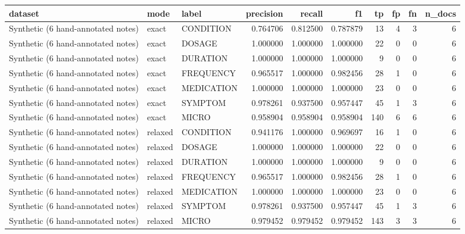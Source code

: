 \begin{tabular}{lllrrrrrrr}
\toprule
dataset & mode & label & precision & recall & f1 & tp & fp & fn & n\_docs \\
\midrule
Synthetic (6 hand-annotated notes) & exact & CONDITION & 0.764706 & 0.812500 & 0.787879 & 13 & 4 & 3 & 6 \\
Synthetic (6 hand-annotated notes) & exact & DOSAGE & 1.000000 & 1.000000 & 1.000000 & 22 & 0 & 0 & 6 \\
Synthetic (6 hand-annotated notes) & exact & DURATION & 1.000000 & 1.000000 & 1.000000 & 9 & 0 & 0 & 6 \\
Synthetic (6 hand-annotated notes) & exact & FREQUENCY & 0.965517 & 1.000000 & 0.982456 & 28 & 1 & 0 & 6 \\
Synthetic (6 hand-annotated notes) & exact & MEDICATION & 1.000000 & 1.000000 & 1.000000 & 23 & 0 & 0 & 6 \\
Synthetic (6 hand-annotated notes) & exact & SYMPTOM & 0.978261 & 0.937500 & 0.957447 & 45 & 1 & 3 & 6 \\
Synthetic (6 hand-annotated notes) & exact & MICRO & 0.958904 & 0.958904 & 0.958904 & 140 & 6 & 6 & 6 \\
Synthetic (6 hand-annotated notes) & relaxed & CONDITION & 0.941176 & 1.000000 & 0.969697 & 16 & 1 & 0 & 6 \\
Synthetic (6 hand-annotated notes) & relaxed & DOSAGE & 1.000000 & 1.000000 & 1.000000 & 22 & 0 & 0 & 6 \\
Synthetic (6 hand-annotated notes) & relaxed & DURATION & 1.000000 & 1.000000 & 1.000000 & 9 & 0 & 0 & 6 \\
Synthetic (6 hand-annotated notes) & relaxed & FREQUENCY & 0.965517 & 1.000000 & 0.982456 & 28 & 1 & 0 & 6 \\
Synthetic (6 hand-annotated notes) & relaxed & MEDICATION & 1.000000 & 1.000000 & 1.000000 & 23 & 0 & 0 & 6 \\
Synthetic (6 hand-annotated notes) & relaxed & SYMPTOM & 0.978261 & 0.937500 & 0.957447 & 45 & 1 & 3 & 6 \\
Synthetic (6 hand-annotated notes) & relaxed & MICRO & 0.979452 & 0.979452 & 0.979452 & 143 & 3 & 3 & 6 \\
\bottomrule
\end{tabular}

